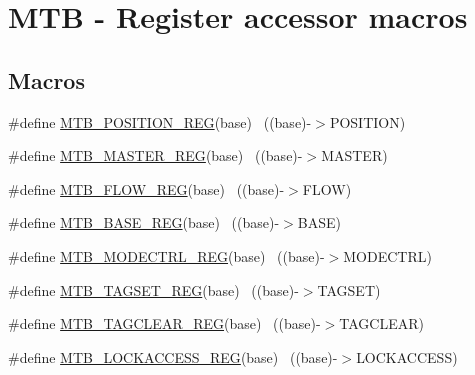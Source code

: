 \hypertarget{group___m_t_b___register___accessor___macros}{}\section{M\+TB -\/ Register accessor macros}
\label{group___m_t_b___register___accessor___macros}
\subsection*{Macros}
\begin{DoxyCompactItemize}
\item 
\#define \hyperlink{group___m_t_b___register___accessor___macros_gad0d320e804f2cd189bb8188e5c78eb8d}{M\+T\+B\+\_\+\+P\+O\+S\+I\+T\+I\+O\+N\+\_\+\+R\+EG}(base)                                  ~((base)-\/$>$P\+O\+S\+I\+T\+I\+ON)
\item 
\#define \hyperlink{group___m_t_b___register___accessor___macros_ga93dc6f817f5ffb588f1ecbc8bcba05f7}{M\+T\+B\+\_\+\+M\+A\+S\+T\+E\+R\+\_\+\+R\+EG}(base)                                      ~((base)-\/$>$M\+A\+S\+T\+ER)
\item 
\#define \hyperlink{group___m_t_b___register___accessor___macros_ga23a937e6a4117d5c9d8f1d6fe2509ba2}{M\+T\+B\+\_\+\+F\+L\+O\+W\+\_\+\+R\+EG}(base)                                          ~((base)-\/$>$F\+L\+OW)
\item 
\#define \hyperlink{group___m_t_b___register___accessor___macros_ga537c73869fe3a759f9b1f569af22a322}{M\+T\+B\+\_\+\+B\+A\+S\+E\+\_\+\+R\+EG}(base)                                          ~((base)-\/$>$B\+A\+SE)
\item 
\#define \hyperlink{group___m_t_b___register___accessor___macros_ga967e6f251a26507381f8a513847751d2}{M\+T\+B\+\_\+\+M\+O\+D\+E\+C\+T\+R\+L\+\_\+\+R\+EG}(base)                                  ~((base)-\/$>$M\+O\+D\+E\+C\+T\+RL)
\item 
\#define \hyperlink{group___m_t_b___register___accessor___macros_ga414e577f28da9f061c48b7312c0af794}{M\+T\+B\+\_\+\+T\+A\+G\+S\+E\+T\+\_\+\+R\+EG}(base)                                      ~((base)-\/$>$T\+A\+G\+S\+ET)
\item 
\#define \hyperlink{group___m_t_b___register___accessor___macros_ga62d2584598c15cb48b0b4fe291bd4a3e}{M\+T\+B\+\_\+\+T\+A\+G\+C\+L\+E\+A\+R\+\_\+\+R\+EG}(base)                                  ~((base)-\/$>$T\+A\+G\+C\+L\+E\+AR)
\item 
\#define \hyperlink{group___m_t_b___register___accessor___macros_ga12183563bcebcfc8b82107780941270e}{M\+T\+B\+\_\+\+L\+O\+C\+K\+A\+C\+C\+E\+S\+S\+\_\+\+R\+EG}(base)                              ~((base)-\/$>$L\+O\+C\+K\+A\+C\+C\+E\+SS)

\end{DoxyCompactItemize}
